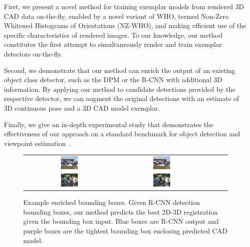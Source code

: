 \documentclass[extendedabs]{bmvc2k}
\begin{document}
First, we present a novel method for training exemplar models from
rendered 3D CAD data on-the-fly, enabled by a novel variant of
WHO, termed Non-Zero Whitened Histograms of Orientations (NZ-WHO), and making
efficient use of the specific characteristics of rendered images. To our
knowledge, our method constitutes the first attempt to simultaneously render
and train exemplar detectors on-the-fly.

Second, we demonstrate that our method can enrich the output of an existing
object class detector, such as the DPM or the
R-CNN with additional 3D information. By applying our
method to candidate detections provided by the respective detector, we can
augment the original detections with an estimate of 3D continuous pose and a 3D
CAD model exemplar.

Finally, we give an in-depth experimental study that demonstrates
the effectiveness of our approach on a standard benchmark for
object detection and viewpoint estimation~\cite{Xiang14}.


\begin{figure}[t]
\small
\setlength\tabcolsep{1pt}
\centering
\begin{tabular}{ccccc}
  \includegraphics[width=0.2\textwidth]{car_cnn/2c.png} &
  \includegraphics[width=0.2\textwidth]{car_cnn/2e.png} \\
  \includegraphics[width=0.2\textwidth]{bicycle_cnn/4b.png} &
  \includegraphics[width=0.2\textwidth]{bicycle_cnn/4c.png} \\
\end{tabular}
\caption{Example enriched bounding boxes. Given R-CNN
	detection bounding boxes, our method predicts the best 2D-3D
	registration given the bounding box input. Blue boxes are R-CNN output and
	purple boxes are the tightest bounding box enclosing predicted CAD model.}
\label{fig:pascal12cnn}
\end{figure}
\end{document}
